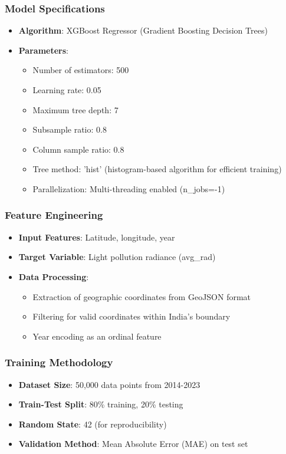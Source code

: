 \documentclass[12pt,a4paper]{article}
\begin{document}
\subsubsection{Model Specifications}
\begin{itemize}
    \item \textbf{Algorithm}: XGBoost Regressor (Gradient Boosting Decision Trees)
    \item \textbf{Parameters}:
    \begin{itemize}
        \item Number of estimators: 500
        \item Learning rate: 0.05
        \item Maximum tree depth: 7
        \item Subsample ratio: 0.8
        \item Column sample ratio: 0.8
        \item Tree method: 'hist' (histogram-based algorithm for efficient training)
        \item Parallelization: Multi-threading enabled (n\_jobs=-1)
    \end{itemize}
\end{itemize}

\subsubsection{Feature Engineering}
\begin{itemize}
    \item \textbf{Input Features}: Latitude, longitude, year
    \item \textbf{Target Variable}: Light pollution radiance (avg\_rad)
    \item \textbf{Data Processing}:
    \begin{itemize}
        \item Extraction of geographic coordinates from GeoJSON format
        \item Filtering for valid coordinates within India's boundary
        \item Year encoding as an ordinal feature
    \end{itemize}
\end{itemize}

\subsubsection{Training Methodology}
\begin{itemize}
    \item \textbf{Dataset Size}: 50,000 data points from 2014-2023
    \item \textbf{Train-Test Split}: 80\% training, 20\% testing
    \item \textbf{Random State}: 42 (for reproducibility)
    \item \textbf{Validation Method}: Mean Absolute Error (MAE) on test set
\end{itemize}
\end{document}
